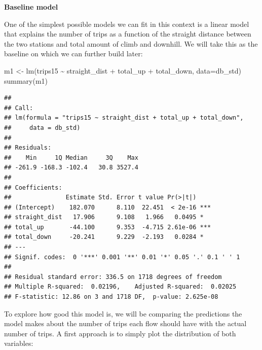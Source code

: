 \documentclass[
]{book}
\newenvironment{Shaded}{\begin{snugshade}}{\end{snugshade}}
\newcommand{\AttributeTok}[1]{\textcolor[rgb]{0.77,0.63,0.00}{#1}}
\newcommand{\FunctionTok}[1]{\textcolor[rgb]{0.00,0.00,0.00}{#1}}
\newcommand{\NormalTok}[1]{#1}
\newcommand{\OtherTok}[1]{\textcolor[rgb]{0.56,0.35,0.01}{#1}}
\newcommand{\StringTok}[1]{\textcolor[rgb]{0.31,0.60,0.02}{#1}}
\begin{document}
\textbf{Baseline model}

One of the simplest possible models we can fit in this context is a linear model that explains the number of trips as a function of the straight distance between the two stations and total amount of climb and downhill. We will take this as the baseline on which we can further build later:

\begin{Shaded}
\begin{Highlighting}[]
\NormalTok{m1 }\OtherTok{\textless{}{-}} \FunctionTok{lm}\NormalTok{(}\StringTok{\textquotesingle{}trips15 \textasciitilde{} straight\_dist + total\_up + total\_down\textquotesingle{}}\NormalTok{, }\AttributeTok{data=}\NormalTok{db\_std)}
\FunctionTok{summary}\NormalTok{(m1)}
\end{Highlighting}
\end{Shaded}

\begin{verbatim}
## 
## Call:
## lm(formula = "trips15 ~ straight_dist + total_up + total_down", 
##     data = db_std)
## 
## Residuals:
##    Min     1Q Median     3Q    Max 
## -261.9 -168.3 -102.4   30.8 3527.4 
## 
## Coefficients:
##               Estimate Std. Error t value Pr(>|t|)    
## (Intercept)    182.070      8.110  22.451  < 2e-16 ***
## straight_dist   17.906      9.108   1.966   0.0495 *  
## total_up       -44.100      9.353  -4.715 2.61e-06 ***
## total_down     -20.241      9.229  -2.193   0.0284 *  
## ---
## Signif. codes:  0 '***' 0.001 '**' 0.01 '*' 0.05 '.' 0.1 ' ' 1
## 
## Residual standard error: 336.5 on 1718 degrees of freedom
## Multiple R-squared:  0.02196,    Adjusted R-squared:  0.02025 
## F-statistic: 12.86 on 3 and 1718 DF,  p-value: 2.625e-08
\end{verbatim}

To explore how good this model is, we will be comparing the predictions the model makes about the number of trips each flow should have with the actual number of trips. A first approach is to simply plot the distribution of both variables:
\end{document}

